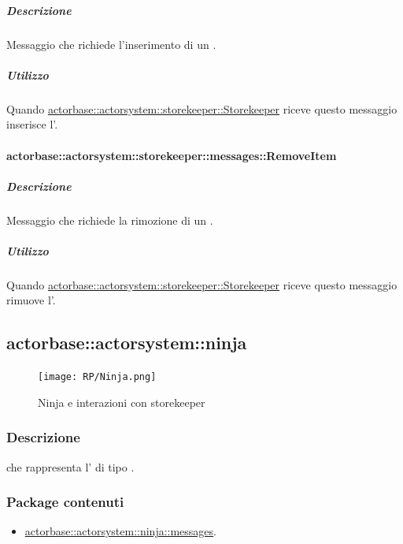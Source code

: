 \documentclass{scalatekids-article}
\begin{document}
\subparagraph{Descrizione}

Messaggio che richiede l'inserimento di un .

\subparagraph{Utilizzo}

Quando \hyperref[sec:actorbase::actorsystem::storekeeper::Storekeeper]{actorbase::actorsystem::storekeeper::Storekeeper}
riceve questo messaggio inserisce l'.

\paragraph{actorbase::actorsystem::storekeeper::messages::RemoveItem}
\label{sec:actorbase::actorsystem::storekeeper::messages::RemoveItem}

\subparagraph{Descrizione}

Messaggio che richiede la rimozione di un .

\subparagraph{Utilizzo}

Quando \hyperref[sec:actorbase::actorsystem::storekeeper::Storekeeper]{actorbase::actorsystem::storekeeper::Storekeeper}
riceve questo messaggio rimuove l'.

\subsection{actorbase::actorsystem::ninja}
\label{sec:actorbase::actorsystem::ninja}

\begin{figure}[H]
  \begin{center}
    \texttt{[image: RP/Ninja.png]}
    \caption{Ninja e interazioni con storekeeper}
  \end{center}
\end{figure}

\subsubsection{Descrizione}

 che rappresenta l' di tipo .

\subsubsection{Package contenuti}

\begin{itemize}

\item \hyperref[sec:actorbase::actorsystem::ninja::messages]{actorbase::actorsystem::ninja::messages}.

\end{itemize}
\end{document}
